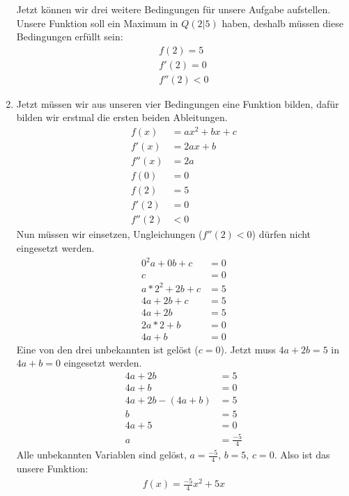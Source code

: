 \begin{flushleft}
\begin{enumerate}
{                Jetzt können wir drei weitere Bedingungen für unsere Aufgabe aufstellen.
                Unsere Funktion soll ein Maximum in $Q(2|5)$ haben, deshalb müssen diese Bedingungen erfüllt sein:
                \begin{align}
                    f(2)=5 \\
                    f'(2)=0 \\
                    f''(2) < 0
                \end{align}
            }
        \item {
                Jetzt müssen wir aus unseren vier Bedingungen eine Funktion bilden, dafür bilden wir erstmal die ersten beiden Ableitungen.
                \begin{align}
                    f(x)&=ax^2+bx+c \\
                    f'(x)&=2ax+b \\
                    f''(x)&=2a \\
                    f(0)&=0 \\
                    f(2)&=5 \\
                    f'(2)&=0 \\
                    f''(2) & < 0
                \end{align}
                Nun müssen wir einsetzen, Ungleichungen ($f''(2) < 0$) dürfen nicht eingesetzt werden.
                \begin{align}
                    0^2a+0b+c &=0 \\
                    c &=0 \\
                    a*2^2+2b+c &= 5 \\
                    4a+2b+c &= 5 \\
                    4a+2b &= 5 \\
                    2a*2+b &=0 \\
                    4a+b &= 0
                \end{align}
                Eine von den drei unbekannten ist gelöst ($c=0$).
                Jetzt muss $4a+2b=5$ in $4a+b=0$ eingesetzt werden.
                \begin{align}
                    4a+2b &=5 \\
                    4a+b &= 0 \\
                    4a+2b-(4a+b) &= 5 \\
                    b &= 5 \\
                    4a+5 &= 0 \\
                    a &= \frac{-5}{4}
                \end{align}
                Alle unbekannten Variablen sind gelöst, $a=\frac{-5}{4}$, $b=5$, $c=0$.
                Also ist das unsere Funktion:
                \begin{align}
                    f(x)=\frac{-5}{4}x^2+5x
                \end{align}
            }
    \end{enumerate}
\end{flushleft}


